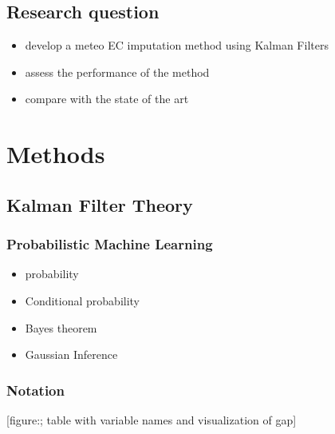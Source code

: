 \documentclass{article}
\let\Oldsection\section
\renewcommand{\section}{\FloatBarrier\Oldsection}
\let\Oldsubsection\subsection
\renewcommand{\subsection}{\FloatBarrier\Oldsubsection}
\let\Oldsubsubsection\subsubsection
\renewcommand{\subsubsection}{\FloatBarrier\Oldsubsubsection}
\begin{document}
\subsection{Research question}
\begin{itemize}
\item develop a meteo EC imputation method using Kalman Filters
\item assess the performance of the method
\item compare with the state of the art
\end{itemize}


\section{Methods}

\subsection{Kalman Filter Theory}

\subsubsection{Probabilistic Machine Learning}

\begin{itemize}
\item probability
\item Conditional probability
\item Bayes theorem
\item Gaussian Inference
\end{itemize}

\subsubsection{Notation}

[figure:; table with variable names and visualization of gap]
\end{document}
